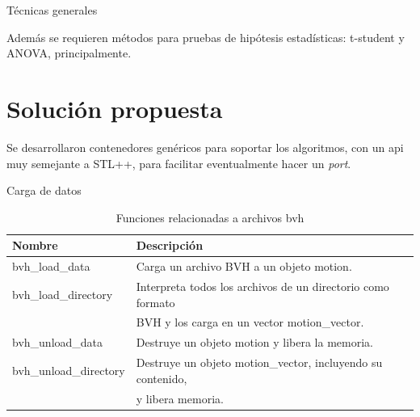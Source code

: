 \documentclass{beamer} %
\newcommand{\mono}[1]{{\ttfamily #1}}
\begin{document}
\begin{frame}{Técnicas generales}
    \begin{block}{}
        Además se requieren métodos para pruebas de hipótesis estadísticas: t-student y ANOVA, principalmente. 
    \end{block}
\end{frame}
   
\section{Solución propuesta}

\begin{frame}
    \begin{block}{}
        Se desarrollaron contenedores genéricos para soportar los algoritmos, con un api muy semejante a STL++, para facilitar eventualmente hacer un \emph{port}.
    \end{block}
\end{frame}

\begin{frame}{Carga de datos}
\begin{table}
    \centering
    \caption{Funciones relacionadas a archivos bvh}
    \label{tab:bvh}
    \scriptsize 
    \begin{tabular}{ll}
        \toprule
        Nombre & Descripción \\
        \midrule
        \mono{bvh\_load\_data} & Carga un archivo BVH a un objeto \mono{motion}. \\
        \mono{bvh\_load\_directory} & Interpreta todos los archivos de un directorio como formato \\ & BVH y los carga en un vector \mono{motion\_vector}. \\
        \mono{bvh\_unload\_data} & Destruye un objeto \mono{motion} y libera la memoria. \\
        \mono{bvh\_unload\_directory} & Destruye un objeto \mono{motion\_vector}, incluyendo su contenido, \\ & y libera memoria. \\
        \bottomrule
    \end{tabular}
\end{table}
\end{frame}
\end{document}
